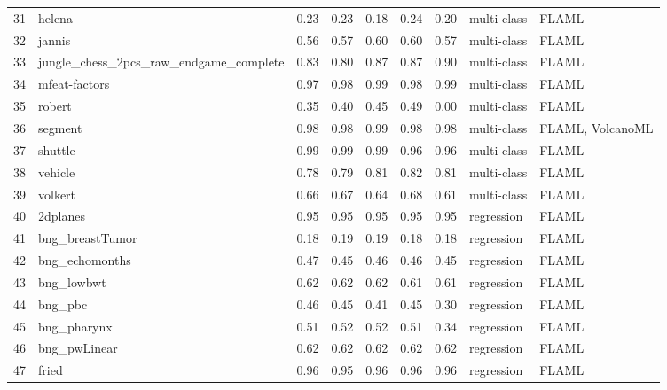 \begin{table*}
\begin{tabular}{lllllllll}
31 & helena                                      & 0.23 & 0.23 & 0.18 & 0.24 & 0.20 & multi-class & FLAML            \\
32 & jannis                                      & 0.56 & 0.57 & 0.60 & 0.60 & 0.57 & multi-class & FLAML            \\
33 & jungle\_chess\_2pcs\_raw\_endgame\_complete & 0.83 & 0.80 & 0.87 & 0.87 & 0.90 & multi-class & FLAML            \\
34 & mfeat-factors                               & 0.97 & 0.98 & 0.99 & 0.98 & 0.99 & multi-class & FLAML            \\
35 & robert                                      & 0.35 & 0.40 & 0.45 & 0.49 & 0.00 & multi-class & FLAML            \\
36 & segment                                     & 0.98 & 0.98 & 0.99 & 0.98 & 0.98 & multi-class & FLAML, VolcanoML \\
37 & shuttle                                     & 0.99 & 0.99 & 0.99 & 0.96 & 0.96 & multi-class & FLAML            \\
38 & vehicle                                     & 0.78 & 0.79 & 0.81 & 0.82 & 0.81 & multi-class & FLAML            \\
39 & volkert                                     & 0.66 & 0.67 & 0.64 & 0.68 & 0.61 & multi-class & FLAML            \\
40 & 2dplanes                                    & 0.95 & 0.95 & 0.95 & 0.95 & 0.95 & regression  & FLAML            \\
41 & bng\_breastTumor                            & 0.18 & 0.19 & 0.19 & 0.18 & 0.18 & regression  & FLAML            \\
42 & bng\_echomonths                             & 0.47 & 0.45 & 0.46 & 0.46 & 0.45 & regression  & FLAML            \\
43 & bng\_lowbwt                                 & 0.62 & 0.62 & 0.62 & 0.61 & 0.61 & regression  & FLAML            \\
44 & bng\_pbc                                    & 0.46 & 0.45 & 0.41 & 0.45 & 0.30 & regression  & FLAML            \\
45 & bng\_pharynx                                & 0.51 & 0.52 & 0.52 & 0.51 & 0.34 & regression  & FLAML            \\
46 & bng\_pwLinear                               & 0.62 & 0.62 & 0.62 & 0.62 & 0.62 & regression  & FLAML            \\
47 & fried                                       & 0.96 & 0.95 & 0.96 & 0.96 & 0.96 & regression  & FLAML            \\

\end{tabular}
\end{table*}
